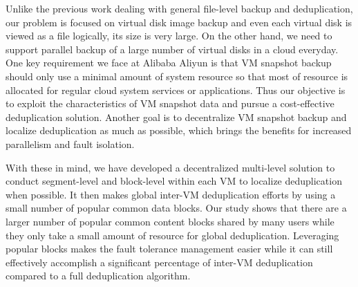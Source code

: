 Unlike the previous work dealing with general file-level backup and deduplication, our problem is focused on 
virtual disk image backup and even each virtual disk is viewed as a file logically, its size is very large.
On the other hand, we need to support parallel backup of a large number of virtual disks in a cloud everyday. 
One key requirement we face at Alibaba Aliyun is that VM snapshot backup should only use a minimal amount of system
resource so that most of resource is allocated for regular cloud system services or applications.
Thus our objective is to exploit the characteristics of VM snapshot data and
pursue a cost-effective deduplication solution. 
Another goal  is to decentralize VM snapshot backup and  localize  deduplication as much as possible,
which brings the benefits for increased parallelism  and fault isolation.


With these in mind, we  have developed a decentralized multi-level solution to conduct 
segment-level  and block-level  within each VM to localize deduplication when possible.
It then makes global inter-VM deduplication efforts by using a small number of
popular common data blocks.  Our study shows that there are a larger number
of popular common content  blocks shared by many users while they only take
a small amount of resource for global deduplication. 
Leveraging popular blocks makes the fault tolerance management easier while
it can still effectively accomplish a significant percentage of inter-VM  deduplication
compared to a full deduplication algorithm. 


